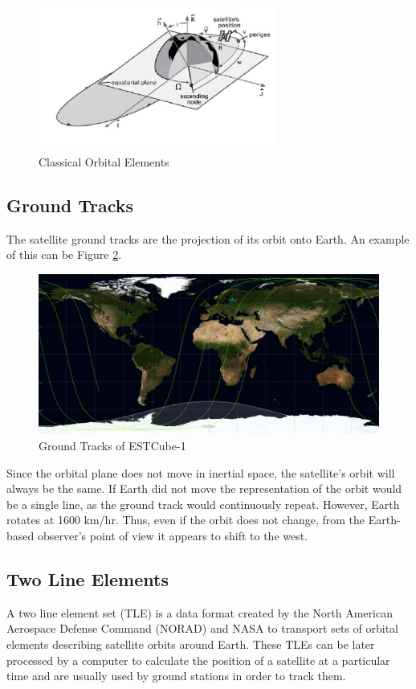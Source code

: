 \begin{figure}[H]
\centerline{\includegraphics[width=0.7\textwidth]{images/COEs.png}}
\caption{Classical Orbital Elements \cite{IntAstr}}
\label{f2.3}
\end{figure}

\subsection{Ground Tracks}\label{2.3}

The satellite ground tracks are the projection of its orbit onto Earth. An example of this can be Figure \ref{f2.4}.

\begin{figure}[H]
\centerline{\includegraphics[width=1\textwidth]{images/GroundTracks.png}}
\caption{Ground Tracks of ESTCube-1}
\label{f2.4}
\end{figure}

Since the orbital plane does not move in inertial space, the satellite's orbit will always be the same. If Earth did not move the representation of the orbit would be a single line, as the ground track would continuously repeat. However, Earth rotates at 1600 km/hr. Thus, even if the orbit does not change, from the Earth-based observer's point of view it appears to shift to the west.

\subsection{Two Line Elements}\label{2.4}
A two line element set (TLE) is a data format created by the North American Aerospace Defense Command (NORAD) and NASA to transport sets of orbital elements describing satellite orbits around Earth. These TLEs can be later processed by a computer to calculate the position of a satellite at a particular time and are usually used by ground stations in order to track them.

